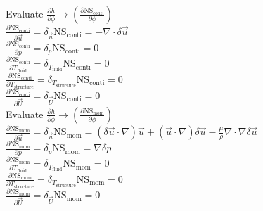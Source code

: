 \documentclass[10pt]{article} %
\begin{document}
\begin{center}
	
	
	
	
	
	
	
	
	
	
	
	
	
	
	
	
	
	
	
	
	
	
	
	
	
	\newpage
	
	Evaluate $\frac{\partial h}{\partial \phi} \rightarrow \left( \frac{\partial \text{NS}_{\text{conti}}}{\partial \phi}\right)$\\
	$\frac{\partial \text{NS}_{\text{conti}}}{\partial \vec{u}} = \delta_{\vec{u}} \text{NS}_{\text{conti}} = - \nabla \cdot \delta \vec{u}$\\
	$\frac{\partial  \text{NS}_{\text{conti}}}{\partial p} = \delta_{p} \text{NS}_{\text{conti}} = 0$\\
	$\frac{\partial  \text{NS}_{\text{conti}}}{\partial T_{\text{fluid}}} = \delta_{T_{\text{fluid}}} \text{NS}_{\text{conti}} = 0$\\
	$\frac{\partial \text{NS}_{\text{conti}}}{\partial T_{\text{structure}}} = \delta_{T_{\text{structure}}} \text{NS}_{\text{conti}} = 0$\\
	$\frac{\partial  \text{NS}_{\text{conti}}}{\partial \vec{U}} = \delta_{\vec{U}} \text{NS}_{\text{conti}} = 0$\\$ $\\
	
	Evaluate $\frac{\partial h}{\partial \phi} \rightarrow \left( \frac{\partial \text{NS}_{\text{mom}}}{\partial \phi}\right)$\\
	$\frac{\partial \text{NS}_{\text{mom}}}{\partial \vec{u}} = \delta_{\vec{u}} \text{NS}_{\text{mom}} = \left(\delta \vec{u} \cdot \nabla\right)\vec{u}+\left(\vec{u}\cdot \nabla\right)\delta \vec{u}- \frac{\mu}{\rho}\nabla \cdot \nabla \delta \vec{u}$\\
	$\frac{\partial \text{NS}_{\text{mom}}}{\partial p} = \delta_{p} \text{NS}_{\text{mom}} = \nabla \delta p $\\
	$\frac{\partial \text{NS}_{\text{mom}}}{\partial T_{\text{fluid}}} = \delta_{T_{\text{fluid}}} \text{NS}_{\text{mom}} = 0$\\
	$\frac{\partial \text{NS}_{\text{mom}}}{\partial T_{\text{structure}}} = \delta_{T_{\text{structure}}} \text{NS}_{\text{mom}} = 0$\\
	$\frac{\partial \text{NS}_{\text{mom}}}{\partial \vec{U}} = \delta_{\vec{U}} \text{NS}_{\text{mom}} = 0$\\$ $\\
	

\end{center}
\end{document}
